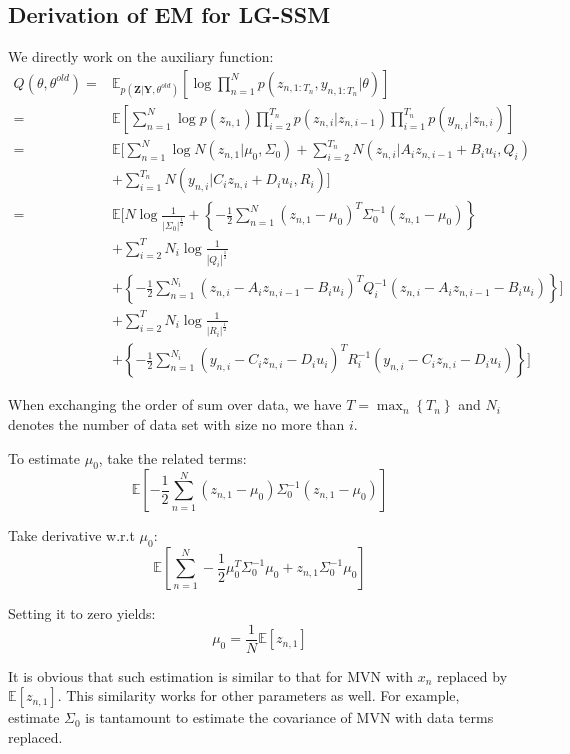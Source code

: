 \documentclass[UTF8]{ctexart}
\begin{document}
\subsection{Derivation of EM for LG-SSM}
We directly work on the auxiliary function:
\begin{align}
Q(\theta,\theta^{old})=&\mathbb{E}_{p(\textbf{Z}|\textbf{Y},\theta^{old})}[\log \prod_{n=1}^{N}p(z_{n,1:T_{n}},y_{n,1:T_{n}}|\theta)]\nonumber \\
=&\mathbb{E}[\sum_{n=1}^{N}\log p(z_{n,1})\prod_{i=2}^{T_{n}}p(z_{n,i}|z_{n,i-1})\prod_{i=1}^{T_{n}}p(y_{n,i}|z_{n,i})]\nonumber \\
=&\mathbb{E}[\sum_{n=1}^{N}\log N(z_{n,1}|\mu_{0},\Sigma_{0})+\sum_{i=2}^{T_{n}}N(z_{n,i}|A_{i}z_{n,i-1}+B_{i}u_{i},Q_{i}) \nonumber \\
\ &+\sum_{i=1}^{T_{n}}N(y_{n,i}|C_{i}z_{n,i}+D_{i}u_{i},R_{i})]\nonumber \\
=&\mathbb{E}[N\log\frac{1}{|\Sigma_{0}|^{\frac{1}{2}}}+\left\{-\frac{1}{2}\sum_{n=1}^{N}(z_{n,1}-\mu_{0})^{T}\Sigma_{0}^{-1}(z_{n,1}-\mu_{0}) \right\} \nonumber \\
\ &+\sum_{i=2}^{T}N_{i}\log\frac{1}{|Q_{i}|^{\frac{1}{2}}}\nonumber \\
\ &+\left\{-\frac{1}{2}\sum_{n=1}^{N_{i}}(z_{n,i}-A_{i}z_{n,i-1}-B_{i}u_{i})^{T}Q_{i}^{-1} (z_{n,i}-A_{i}z_{n,i-1}-B_{i}u_{i}) \right\}   ]\nonumber \\
\ &+\sum_{i=2}^{T}N_{i}\log\frac{1}{|R_{i}|^{\frac{1}{2}}}\nonumber \\
\ &+\left\{-\frac{1}{2}\sum_{n=1}^{N_{i}}(y_{n,i}-C_{i}z_{n,i}-D_{i}u_{i})^{T}R_{i}^{-1} (y_{n,i}-C_{i}z_{n,i}-D_{i}u_{i})\right\}   ]\nonumber 
\end{align}

When exchanging the order of sum over data, we have $T=\max_{n}\left\{T_{n} \right\}$ and $N_{i}$ denotes the number of data set with size no more than $i$.

To estimate $\mu_{0}$, take the related terms:
$$\mathbb{E}[-\frac{1}{2}\sum_{n=1}^{N}(z_{n,1}-\mu_{0})\Sigma_{0}^{-1}(z_{n,1}-\mu_{0})]$$

Take derivative w.r.t $\mu_{0}$:
$$\mathbb{E}[\sum_{n=1}^{N}-\frac{1}{2}\mu_{0}^{T}\Sigma_{0}^{-1}\mu_{0}+z_{n,1}\Sigma^{-1}_{0}\mu_{0}]$$

Setting it to zero yields:
$$\mu_{0}=\frac{1}{N}\mathbb{E}[z_{n,1}]$$

It is obvious that such estimation is similar to that for MVN with $x_{n}$ replaced by $\mathbb{E}[z_{n,1}]$. This similarity works for other parameters as well. For example, estimate $\Sigma_{0}$ is tantamount to estimate the covariance of MVN with data terms replaced.
\end{document}
